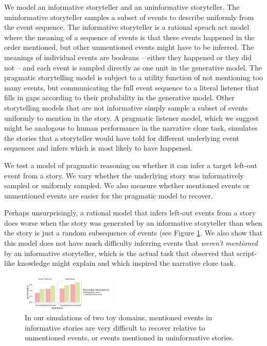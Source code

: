 \documentclass[10pt,a4paper]{article}
\begin{document}
We model an informative storyteller and an uninformative storyteller. The uninformative storyteller samples a subset of events to describe uniformly from the event sequence. The informative storyteller is a rational speach act model \cite{frank2012predicting, goodman2013knowledge} where the meaning of a sequence of events is that these events happened in the order mentioned, but other unmentioned events might have to be inferred. The meanings of individual events are booleans -- either they happened or they did not -- and each event is sampled directly as one unit in the generative model. The pragmatic storytelling model is subject to a utility function of not mentioning too many events, but communicating the full event sequence to a literal listener that fills in gaps according to their probability in the generative model. Other storytelling models that are not informative simply sample a subset of events uniformly to mention in the story. A pragmatic listener model, which we suggest might be analogous to human performance in the narrative cloze task, simulates the stories that a storyteller would have told for different underlying event sequences and infers which is most likely to have happened.

We test a model of pragmatic reasoning on whether it can infer a target left-out event from a story. We vary whether the underlying story was informatively sampled or uniformly sampled. We also measure whether mentioned events or unmentioned events are easier for the pragmatic model to recover.

Perhaps unsurprisingly,
a rational model that infers left-out events from a story does worse when the story was generated by an informative storyteller than when the story is just a random subsequence of events (see Figure \ref{fig:cloze-simulation}.
We also show that this model does not have much difficulty inferring events that {\em weren't mentioned} by an informative storyteller, which is the actual task that  observed that script-like knowledge might explain and which inspired the narrative cloze task.

\begin{figure}
 \centering
 \includegraphics[width=0.4\textwidth]{images/cloze-simulation.png}
 \caption{In our simulations of two toy domains, mentioned events in informative stories are very difficult to recover relative to unmentioned events, or events mentioned in uninformative stories.}
 \label{fig:cloze-simulation}
\end{figure}
\end{document}
